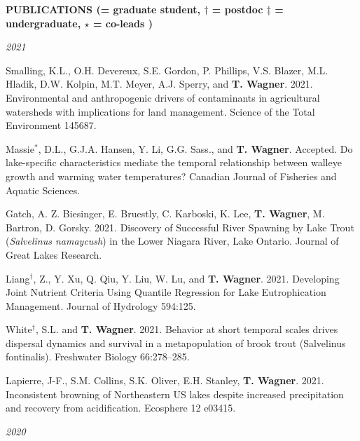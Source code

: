 \documentclass[10pt]{article}
\begin{document}
\begin{flushleft}
\vspace{8pt}
\centerline {\bf{PUBLICATIONS ({\small * = graduate student, $\dagger$ = postdoc $\ddagger$ = undergraduate, $\star$ = co-leads })}}
\vspace{5pt}
\emph{2021}
\begin{etaremune}[start=111]

\item Smalling, K.L., O.H. Devereux, S.E. Gordon, P. Phillips, V.S. Blazer, M.L. Hladik, D.W. Kolpin, M.T. Meyer, A.J. Sperry, and \textbf{T. Wagner}. 2021. Environmental and anthropogenic drivers of contaminants in agricultural watersheds with implications for land management.  Science of the Total Environment 145687.

\item Massie$^*$, D.L., G.J.A. Hansen, Y. Li, G.G. Sass., and \textbf{T. Wagner}. Accepted. Do lake-specific characteristics mediate the temporal relationship between walleye growth and warming water temperatures? Canadian Journal of Fisheries and Aquatic Sciences.

\item Gatch, A. Z. Biesinger, E. Bruestly, C. Karboski, K. Lee, \textbf{T. Wagner}, M. Bartron, D. Gorsky.  2021. Discovery of Successful River Spawning by Lake Trout (\textit{Salvelinus namaycush}) in the Lower Niagara River, Lake Ontario. Journal of Great Lakes Research.

\item Liang$^\dagger$, Z., Y. Xu, Q. Qiu, Y. Liu, W. Lu, and \textbf{T. Wagner}.  2021. Developing Joint Nutrient Criteria Using Quantile Regression for Lake Eutrophication Management. Journal of Hydrology 594:125.


\item White$^\dagger$, S.L. and \textbf{T. Wagner}.  2021. Behavior at short temporal scales drives dispersal dynamics and survival in a metapopulation of brook trout (Salvelinus fontinalis). Freshwater Biology 66:278–285.


\item Lapierre, J-F., S.M. Collins, S.K. Oliver, E.H. Stanley, \textbf{T. Wagner}. 2021.  Inconsistent browning of Northeastern US lakes despite increased precipitation and recovery from acidification. Ecosphere 12 e03415.

\end{etaremune}

\vspace{5pt}
\emph{2020}
\begin{etaremune}[start=105]




\end{etaremune}
\end{flushleft}
\end{document}
